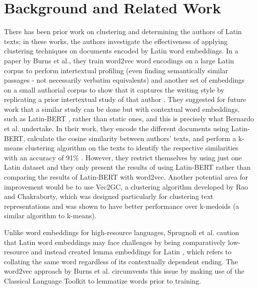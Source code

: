 \documentclass{csfourzero}
\begin{document}
\section{Background and Related Work}
\label{sec:lit}
There has been prior work on clustering and determining the authors of Latin texts; in these works, the authors investigate the effectiveness of applying clustering techniques on documents encoded by Latin word embeddings. In a paper by Burns et al., they train word2vec word encodings on a large Latin corpus to perform intertextual profiling (even finding semantically similar passages - not necessarily verbatim equivalents) and another set of embeddings on a small authorial corpus to show that it captures the writing style by replicating a prior intertextual study of that author \cite{burns-etal-2021-profiling}. They suggested for future work that a similar study can be done but with contextual word embeddings, such as Latin-BERT \cite{https://doi.org/10.48550/arxiv.2009.10053}, rather than static ones, and this is precisely what Bernardo et al. undertake. In their work, they encode the different documents using Latin-BERT, calculate the cosine similarity between authors’ texts, and perform a k-means clustering algorithm on the texts to identify the respective similarities with an accuracy of 91$\%$ \cite{https://doi.org/10.48550/arxiv.2109.00601}. However, they restrict themselves by using just one Latin dataset and they only present the results of using Latin-BERT rather than comparing the results of Latin-BERT with word2vec. Another potential area for improvement would be to use Vec2GC, a clustering algorithm developed by Rao and Chakraborty, which was designed particularly for clustering text representations \cite{https://doi.org/10.48550/arxiv.2104.09439} and was shown to have better performance over k-medoids (a similar algorithm to k-means). 

Unlike word embeddings for high-resource languages, Sprugnoli et al. caution that Latin word embeddings may face challenges by being comparatively low-resource and instead created lemma embeddings for Latin \cite{Sprugnoli2020BuildingAC}, which refers to collating the same word regardless of its contextually dependent ending. The word2vec approach by Burns et al. circumvents this issue by making use of the Classical Language Toolkit \cite{johnson-etal-2021-classical} to lemmatize words prior to training.
\end{document}
